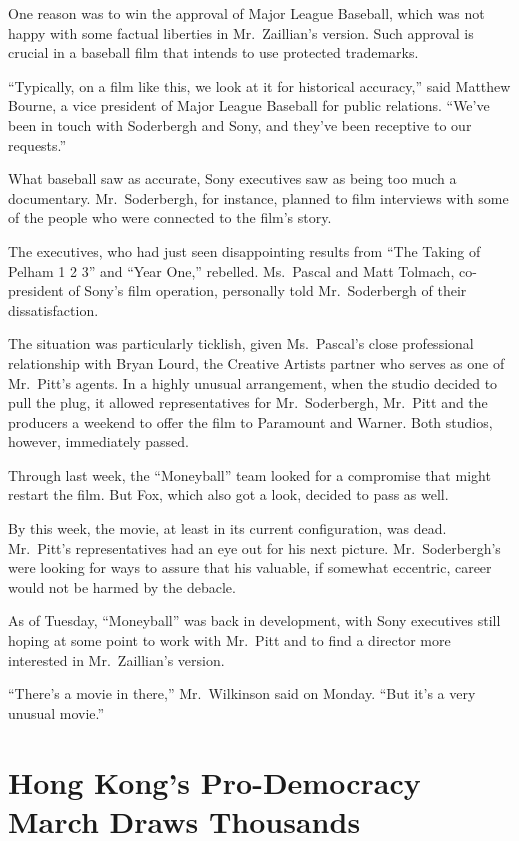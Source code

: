 ﻿\documentclass[12pt]{article}
\begin{document}
One reason was to win the approval of Major League Baseball, which was not happy with some factual
liberties in Mr.~Zaillian's version. Such approval is crucial in a baseball film that intends to use
protected trademarks.

``Typically, on a film like this, we look at it for historical accuracy,'' said Matthew Bourne, a
vice president of Major League Baseball for public relations. ``We've been in touch with Soderbergh
and Sony, and they've been receptive to our requests.''

What baseball saw as accurate, Sony executives saw as being too much a documentary. Mr.~Soderbergh,
for instance, planned to film interviews with some of the people who were connected to the film's
story.

The executives, who had just seen disappointing results from ``The Taking of Pelham 1 2 3'' and
``Year One,'' rebelled. Ms.~Pascal and Matt Tolmach, co-president of Sony's film operation,
personally told Mr.~Soderbergh of their dissatisfaction.

The situation was particularly ticklish, given Ms.~Pascal's close professional relationship with
Bryan Lourd, the Creative Artists partner who serves as one of Mr.~Pitt's agents. In a highly
unusual arrangement, when the studio decided to pull the plug, it allowed representatives for
Mr.~Soderbergh, Mr.~Pitt and the producers a weekend to offer the film to Paramount and Warner. Both
studios, however, immediately passed.

Through last week, the ``Moneyball'' team looked for a compromise that might restart the film. But
Fox, which also got a look, decided to pass as well.

By this week, the movie, at least in its current configuration, was dead. Mr.~Pitt's representatives
had an eye out for his next picture. Mr.~Soderbergh's were looking for ways to assure that his
valuable, if somewhat eccentric, career would not be harmed by the debacle.

As of Tuesday, ``Moneyball'' was back in development, with Sony executives still hoping at some
point to work with Mr.~Pitt and to find a director more interested in Mr.~Zaillian's version.

``There's a movie in there,'' Mr.~Wilkinson said on Monday. ``But it's a very unusual movie.''

\section{Hong Kong's Pro-Democracy March Draws Thousands}
\end{document}
